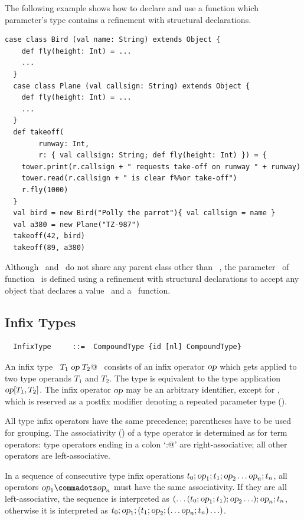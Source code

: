 \example The following example shows how to declare and use a function which parameter's type contains a refinement with structural declarations.
\begin{lstlisting}[escapechar=\%]
  case class Bird (val name: String) extends Object {
  	def fly(height: Int) = ...
	...
  }
  case class Plane (val callsign: String) extends Object {
  	def fly(height: Int) = ...
	...
  }
  def takeoff(
  	    runway: Int,
        r: { val callsign: String; def fly(height: Int) }) = {
    tower.print(r.callsign + " requests take-off on runway " + runway)
    tower.read(r.callsign + " is clear f%%or take-off")
    r.fly(1000)
  }
  val bird = new Bird("Polly the parrot"){ val callsign = name }
  val a380 = new Plane("TZ-987")
  takeoff(42, bird)
  takeoff(89, a380)
\end{lstlisting}
Although ~\lstinline@Bird@ and ~\lstinline@Plane@ do not share any parent class other than ~\lstinline@Object@, the parameter ~\lstinline@r@ of function ~\lstinline@takeoff@ is defined using a refinement with structural declarations to accept any object that declares a value ~\lstinline@callsign@ and a ~\lstinline@fly@ function.

 
\subsection{Infix Types}\label{sec:infix-types}

\syntax\begin{lstlisting}
  InfixType     ::=  CompoundType {id [nl] CompoundType}
\end{lstlisting}
An infix type ~\lstinline@$T_1\;\mbox{\sl op}\;T_2$@~ consists of an infix
operator $\mbox{\sl op}$ which gets applied to two type operands $T_1$ and
$T_2$.  The type is equivalent to the type application $\mbox{\sl op}[T_1,
T_2]$.  The infix operator $\mbox{\sl op}$ may be an arbitrary identifier,
except for \code{*}, which is reserved as a postfix modifier 
denoting a repeated parameter type (). 

All type infix operators have the same precedence; parentheses have to
be used for grouping. The associativity ()
of a type operator is determined as for term operators: type operators
ending in a colon `\lstinline@:@' are right-associative; all other
operators are left-associative.

In a sequence of consecutive type infix operations $t_0; \mbox{\sl op}_1; t_1;
\mbox{\sl op}_2 \ldots \mbox{\sl op}_n; t_n$, all operators $\op_1 \commadots \op_n$ must have the same
associativity. If they are all left-associative, the sequence is
interpreted as $(\ldots(t_0;\mbox{\sl op}_1;t_1);\mbox{\sl op}_2\ldots);\mbox{\sl op}_n;t_n$,
otherwise it is interpreted as $t_0;\mbox{\sl op}_1;(t_1;\mbox{\sl op}_2;(\ldots\mbox{\sl op}_n;t_n)\ldots)$.

